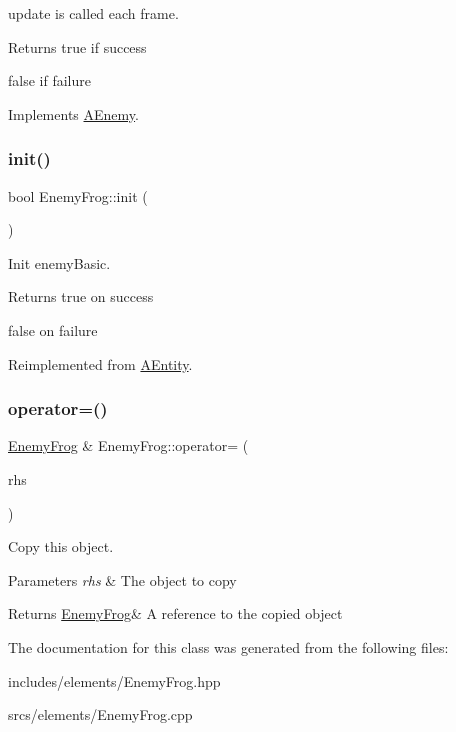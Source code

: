 update is called each frame. 

\begin{DoxyReturn}{Returns}
true if success 

false if failure 
\end{DoxyReturn}


Implements \hyperlink{class_a_enemy_abefc22131eb1c618819c67c3c1415c08}{A\+Enemy}.

\mbox{\label{class_enemy_frog_adb2293192dd66ee46da359833475915b}} 
\subsubsection{\texorpdfstring{init()}{init()}}
{\footnotesize\ttfamily bool Enemy\+Frog\+::init (\begin{DoxyParamCaption}{ }\end{DoxyParamCaption})\hspace{0.3cm}{\ttfamily [virtual]}}



Init enemy\+Basic. 

\begin{DoxyReturn}{Returns}
true on success 

false on failure 
\end{DoxyReturn}


Reimplemented from \hyperlink{class_a_entity_a450361b684fa02e4ffe0ba406b8e3b30}{A\+Entity}.

\mbox{\label{class_enemy_frog_aa92a00c282df87e83ab76c33137a6c9d}} 
\subsubsection{\texorpdfstring{operator=()}{operator=()}}
{\footnotesize\ttfamily \hyperlink{class_enemy_frog}{Enemy\+Frog} \& Enemy\+Frog\+::operator= (\begin{DoxyParamCaption}\item[{\hyperlink{class_enemy_frog}{Enemy\+Frog} const \&}]{rhs }\end{DoxyParamCaption})}



Copy this object. 


\begin{DoxyParams}{Parameters}
{\em rhs} & The object to copy \\
\hline
\end{DoxyParams}
\begin{DoxyReturn}{Returns}
\hyperlink{class_enemy_frog}{Enemy\+Frog}\& A reference to the copied object 
\end{DoxyReturn}


The documentation for this class was generated from the following files\+:\begin{DoxyCompactItemize}
\item 
includes/elements/Enemy\+Frog.\+hpp\item 
srcs/elements/Enemy\+Frog.\+cpp\end{DoxyCompactItemize}
